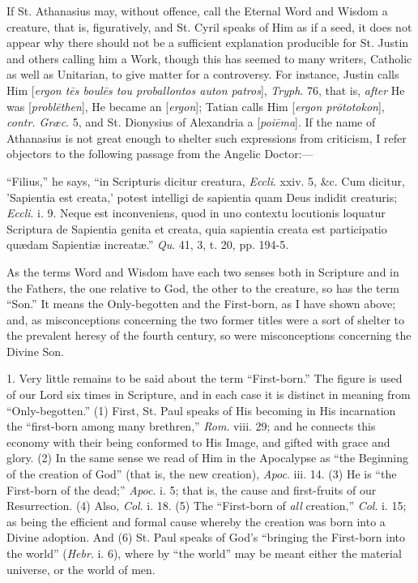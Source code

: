 If St. Athanasius may, without offence, call the Eternal Word and
Wisdom a creature, that is, figuratively, and St. Cyril speaks
of Him as if a seed, it does not appear why there should not be a
sufficient explanation producible for St. Justin and others calling
him a Work, though this has seemed to many writers, Catholic as well
as Unitarian, to give matter for a controversy. For instance, Justin
calls Him [\emph{ergon t\={e}s boul\={e}s tou proballontos auton
patros}], \emph{Tryph}. 76, that is, \emph{after} He was [\emph{probl\={e}then}],
He became an [\emph{ergon}]; Tatian calls Him [\emph{ergon pr\={o}totokon}],
\emph{contr. Græc}. 5, and St. Dionysius of Alexandria a [\emph{poi\={e}ma}].
If the name of Athanasius is not great enough to shelter such
expressions from criticism, I refer objectors to the following passage
from the Angelic Doctor:—

``Filius,'' he says, ``in Scripturis dicitur creatura, \emph{Eccli}.
xxiv. 5, \&c. Cum dicitur, 'Sapientia est creata,' potest intelligi
de sapientia quam Deus indidit creaturis; \emph{Eccli}. i. 9. Neque
est inconveniens, quod in uno contextu locutionis loquatur Scriptura
de Sapientia genita et creata, quia sapientia creata est participatio
quædam Sapientiæ increatæ.'' \emph{Qu}. 41, 3, t. 20, pp.
194-5.


As the terms Word and Wisdom have each two senses both in Scripture
and in the Fathers, the one relative to God, the other to the
creature, so has the term ``Son.'' It means the Only-begotten
and the First-born, as I have shown above; and, as misconceptions
concerning the two former titles were a sort of shelter to the
prevalent heresy of the fourth century, so were misconceptions
concerning the Divine Son.

1. Very little remains to be said about the term
``First-born.'' The figure is used of our Lord six times
in Scripture, and in each case it is distinct in meaning from
``Only-begotten.'' (1) First, St. Paul speaks of His becoming
in His incarnation the ``first-born among many brethren,'' \emph{Rom}.
viii. 29; and he connects this economy with their being conformed to
His Image, and gifted with grace and glory. (2) In the same sense we
read of Him in the Apocalypse as ``the Beginning of the creation
of God'' (that is, the new creation), \emph{Apoc}. iii. 14. (3) He
is ``the First-born of the dead;'' \emph{Apoc}. i. 5; that is,
the cause and first-fruits of our Resurrection. (4) Also, \emph{Col}.
i. 18. (5) The ``First-born of \emph{all} creation,'' \emph{Col}.
i. 15; as being the efficient and formal cause whereby the creation
was born into a Divine adoption. And (6) St. Paul speaks of God's
``bringing the First-born into the world'' (\emph{Hebr}. i.
6), where by ``the world'' may be meant either the material
universe, or the world of men.

